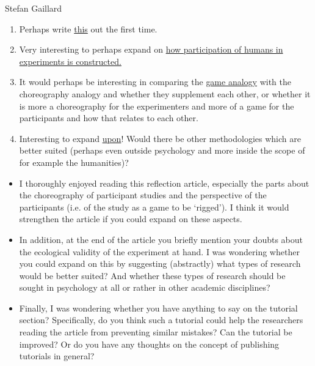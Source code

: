 \documentclass[twocolumn, serif, authordate, review]{jote-article}
\begin{document}
\begin{paracol}{2}
\begin{reviewend}{Stefan Gaillard}
    \begin{enumerate}[label=\textbf{\arabic*}), start=0]
    \item Perhaps write \hyperref[sec:eeg]{this} out the first time.
    \item Very interesting to perhaps expand on \hyperref[sec:constructed] {how participation of humans in experiments is constructed.}
    \item It would perhaps be interesting in comparing the \hyperref[sec:game]{game analogy} with the choreography analogy and whether they supplement each other, or whether it is more a choreography for the experimenters and more of a game for the participants and how that relates to each other. 
    \item Interesting to expand \hyperref[sec:limit]{upon}! Would there be other methodologies which are better suited (perhaps even outside psychology and more inside the scope of for example the humanities)? 
    \end{enumerate}
    \begin{itemize}
    \item I thoroughly enjoyed reading this reflection article, especially the parts about the choreography of participant studies and the perspective of the participants (i.e. of the study as a game to be ‘rigged’). I think it would strengthen the article if you could expand on these aspects.  
    \item In addition, at the end of the article you briefly mention your doubts about the ecological validity of the experiment at hand. I was wondering whether you could expand on this by suggesting (abstractly) what types of research would be better suited? And whether these types of research should be sought in psychology at all or rather in other academic disciplines?  
    \item Finally, I was wondering whether you have anything to say on the tutorial section? Specifically, do you think such a tutorial could help the researchers reading the article from preventing similar mistakes? Can the tutorial be improved? Or do you have any thoughts on the concept of publishing tutorials in general?  
    \end{itemize}
\end{reviewend}


\end{paracol}
\end{document}
